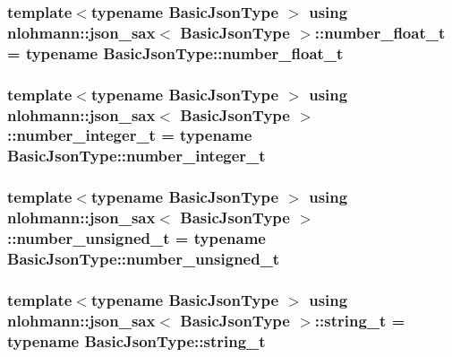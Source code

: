 \subsubsection[{\texorpdfstring{number\+\_\+float\+\_\+t}{number_float_t}}]{\setlength{\rightskip}{0pt plus 5cm}template$<$typename Basic\+Json\+Type $>$ using {\bf nlohmann\+::json\+\_\+sax}$<$ Basic\+Json\+Type $>$\+::{\bf number\+\_\+float\+\_\+t} =  typename Basic\+Json\+Type\+::number\+\_\+float\+\_\+t}\hypertarget{structnlohmann_1_1json__sax_a390c209bffd8c4800c8f3076dc465a20}{}\label{structnlohmann_1_1json__sax_a390c209bffd8c4800c8f3076dc465a20}
\subsubsection[{\texorpdfstring{number\+\_\+integer\+\_\+t}{number_integer_t}}]{\setlength{\rightskip}{0pt plus 5cm}template$<$typename Basic\+Json\+Type $>$ using {\bf nlohmann\+::json\+\_\+sax}$<$ Basic\+Json\+Type $>$\+::{\bf number\+\_\+integer\+\_\+t} =  typename Basic\+Json\+Type\+::number\+\_\+integer\+\_\+t}\hypertarget{structnlohmann_1_1json__sax_a0cef30121f02b7fee85e9708148ea0aa}{}\label{structnlohmann_1_1json__sax_a0cef30121f02b7fee85e9708148ea0aa}
\subsubsection[{\texorpdfstring{number\+\_\+unsigned\+\_\+t}{number_unsigned_t}}]{\setlength{\rightskip}{0pt plus 5cm}template$<$typename Basic\+Json\+Type $>$ using {\bf nlohmann\+::json\+\_\+sax}$<$ Basic\+Json\+Type $>$\+::{\bf number\+\_\+unsigned\+\_\+t} =  typename Basic\+Json\+Type\+::number\+\_\+unsigned\+\_\+t}\hypertarget{structnlohmann_1_1json__sax_a32028cc056ae0f43aaae331cdbbbf856}{}\label{structnlohmann_1_1json__sax_a32028cc056ae0f43aaae331cdbbbf856}
\subsubsection[{\texorpdfstring{string\+\_\+t}{string_t}}]{\setlength{\rightskip}{0pt plus 5cm}template$<$typename Basic\+Json\+Type $>$ using {\bf nlohmann\+::json\+\_\+sax}$<$ Basic\+Json\+Type $>$\+::{\bf string\+\_\+t} =  typename Basic\+Json\+Type\+::string\+\_\+t}\hypertarget{structnlohmann_1_1json__sax_ae01977a9f3c5b3667b7a2929ed91061e}{}\label{structnlohmann_1_1json__sax_ae01977a9f3c5b3667b7a2929ed91061e}


